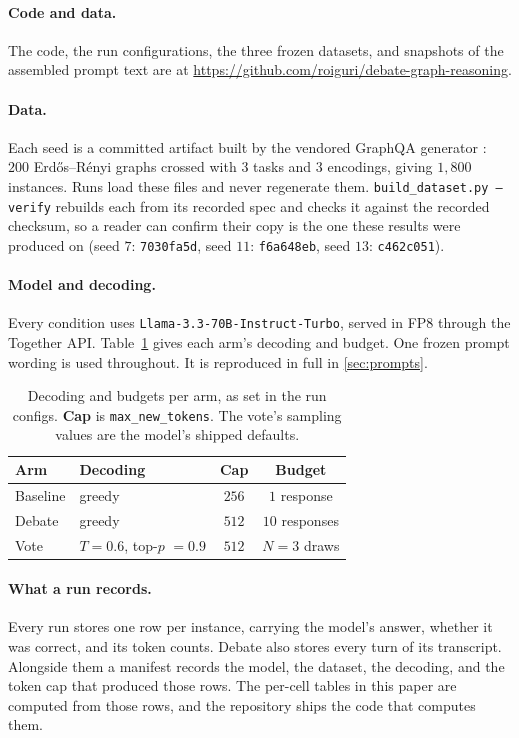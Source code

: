 \documentclass[11pt]{article}
\begin{document}
\paragraph{Code and data.} The code, the run configurations, the three frozen
datasets, and snapshots of the assembled prompt text are at
\url{https://github.com/roiguri/debate-graph-reasoning}.

\paragraph{Data.} Each seed is a committed artifact built by the vendored GraphQA
generator \citep{fatemi2024talk}: $200$ Erd\H{o}s--R\'enyi graphs crossed with $3$ tasks
and $3$ encodings, giving $1{,}800$ instances. Runs load these files and never
regenerate them. \texttt{build\_dataset.py --verify} rebuilds each from its recorded
spec and checks it against the recorded checksum, so a reader can confirm their copy is
the one these results were produced on (seed $7$: \texttt{7030fa5d}, seed $11$:
\texttt{f6a648eb}, seed $13$: \texttt{c462c051}).

\paragraph{Model and decoding.} Every condition uses
\texttt{Llama-3.3-70B-Instruct-Turbo}, served in FP8 through the Together API.
Table~\ref{tab:runconfig} gives each arm's decoding and budget. One frozen prompt
wording is used throughout. It is reproduced in full in \ref{sec:prompts}.

\begin{table}[h]
  \centering
  \small
  \begin{tabular}{@{}llcc@{}}
    \toprule
    \textbf{Arm} & \textbf{Decoding} & \textbf{Cap} & \textbf{Budget} \\
    \midrule
    Baseline & greedy & $256$ & $1$ response \\
    Debate   & greedy & $512$ & $10$ responses \\
    Vote     & $T = 0.6$, top-$p$ $= 0.9$ & $512$ & $N = 3$ draws \\
    \bottomrule
  \end{tabular}
  \caption{Decoding and budgets per arm, as set in the run configs. \textbf{Cap} is
  \texttt{max\_new\_tokens}. The vote's sampling values are the model's shipped
  defaults.}
  \label{tab:runconfig}
\end{table}

\paragraph{What a run records.} Every run stores one row per instance, carrying the
model's answer, whether it was correct, and its token counts. Debate also stores every
turn of its transcript. Alongside them a manifest records the model, the dataset, the
decoding, and the token cap that produced those rows. The per-cell tables in this paper
are computed from those rows, and the repository ships the code that computes them.
\end{document}
